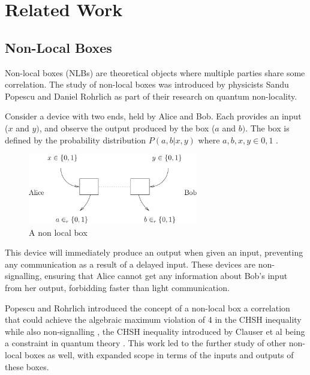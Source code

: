 \documentclass[report.tex]{subfiles}
\begin{document}
\chapter{Related Work} %
\label{cha:related_work}


\section{Non-Local Boxes} %
\label{sec:related_nlbs}
Non-local boxes (NLBs) are theoretical objects where multiple parties share some
correlation. The study of non-local boxes was introduced by physicists Sandu
Popescu and Daniel Rohrlich as part of their research on quantum non-locality.

Consider a device with two ends, held by Alice and Bob. Each provides an
input (\(x\) and \(y)\), and observe the output produced by the box (\(a\) and
\(b)\). The box is defined by the probability distribution \(P(a,b | x,y)\) 
where \(a, b, x, y \in {0, 1}\) \cite{nlb_lamontagne}. 

\begin{figure}[H]
  \centering
  \includegraphics[width=0.66\textwidth]{img/nlb}
  \caption{A non local box \cite[Section~I]{2006quant.ph..9166D}}
\end{figure}

This device will immediately produce an output when given an input, preventing
any communication as a result of a delayed input. These devices are
non-signalling, ensuring that Alice cannot get any information about Bob's input
from her output, forbidding faster than light communication.

Popescu and Rohrlich introduced the concept of a non-local box a correlation 
that could achieve the algebraic maximum violation of 4 in the CHSH inequality
while also non-signalling \cite{ref1}, the CHSH inequality introduced by Clauser
et al being a constraint in quantum theory \cite{PhysRevLett.23.880}. This work
led to the further study of other non-local boxes as well, with expanded scope
in terms of the inputs and outputs of these boxes.
\end{document}
